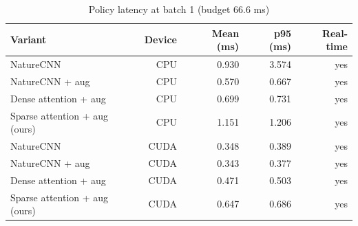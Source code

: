 \begin{table}[t]
\centering
\caption{Policy latency at batch 1 (budget 66.6 ms)}
\label{tab:inference_latency}
\begin{tabular}{lrrrr}
\toprule
Variant & Device & Mean (ms) & p95 (ms) & Real-time \\
\midrule
NatureCNN & CPU & 0.930 & 3.574 & yes \\
NatureCNN + aug & CPU & 0.570 & 0.667 & yes \\
Dense attention + aug & CPU & 0.699 & 0.731 & yes \\
Sparse attention + aug (ours) & CPU & 1.151 & 1.206 & yes \\
NatureCNN & CUDA & 0.348 & 0.389 & yes \\
NatureCNN + aug & CUDA & 0.343 & 0.377 & yes \\
Dense attention + aug & CUDA & 0.471 & 0.503 & yes \\
Sparse attention + aug (ours) & CUDA & 0.647 & 0.686 & yes \\
\bottomrule
\end{tabular}
\end{table}
